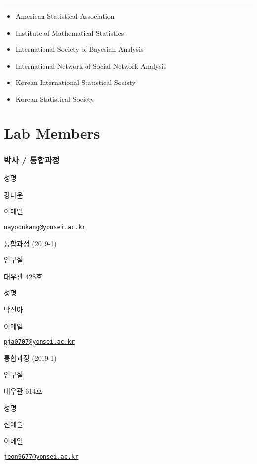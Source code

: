 \documentclass[
]{book}
\providecommand{\tightlist}{%
  \setlength{\itemsep}{0pt}\setlength{\parskip}{0pt}}
\begin{document}
\begin{center}\rule{0.5\linewidth}{0.5pt}\end{center}

\begin{itemize}
\tightlist
\item
  American Statistical Association
\item
  Institute of Mathematical Statistics
\item
  International Society of Bayesian Analysis
\item
  International Network of Social Network Analysis
\item
  Korean International Statistical Society
\item
  Korean Statistical Society
\end{itemize}

\hypertarget{lab-members}{%
\chapter*{Lab Members}\label{lab-members}}

\hypertarget{uxbc15uxc0ac-uxd1b5uxd569uxacfcuxc815}{%
\subsection*{박사 / 통합과정}\label{uxbc15uxc0ac-uxd1b5uxd569uxacfcuxc815}}

성명

강나윤

이메일

\href{mailto:nayoonkang@yonsei.ac.kr}{\nolinkurl{nayoonkang@yonsei.ac.kr}}

통합과정 (2019-1)

연구실

대우관 428호

성명

박진아

이메일

\href{mailto:pja0707@yonsei.ac.kr}{\nolinkurl{pja0707@yonsei.ac.kr}}

통합과정 (2019-1)

연구실

대우관 614호

성명

전예슬

이메일

\href{mailto:jeon9677@yonsei.ac.kr}{\nolinkurl{jeon9677@yonsei.ac.kr}}
\end{document}
